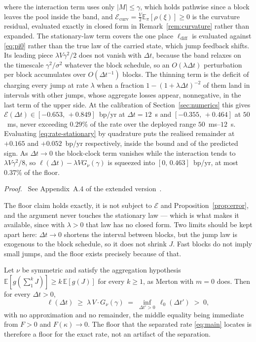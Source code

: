 \documentclass[runningheads]{llncs}
\newcommand{\E}{\mathbb{E}}
\newcommand{\dt}{\Delta t}
\newcommand{\1}{\mathbf{1}}
\newif\ifextended
\newcommand{\deferproof}[1]{%
  \par\smallskip\noindent\textit{Proof.}\ \ifextended
  See Appendix~#1.\else
  See Appendix~#1 of the extended version~\cite{bundi2026ext}.\fi\par\smallskip}
\begin{document}
\begin{proposition}
where the interaction term uses only $|M|\le\gamma$, which holds pathwise since a block leaves the pool inside the band, and $\mathcal{E}_{\mathrm{curv}} = \tfrac{V}{2}\E_\pi[\rho(\xi)] \ge 0$ is the curvature residual, evaluated exactly in closed form in Remark~\ref{rem:curvature} rather than expanded. The stationary-law term covers the one place $\ell_{\mathrm{diff}}$ is evaluated against \eqref{eq:pi0} rather than the true law of the carried state, which jump feedback shifts. Its leading piece $\lambda V\gamma^2/2$ does not vanish with $\dt$, because the band relaxes on the timescale $\gamma^2/\sigma^2$ whatever the block schedule, so an $O(\lambda\dt)$ perturbation per block accumulates over $O(\dt^{-1})$ blocks. The thinning term is the deficit of charging every jump at rate $\lambda$ when a fraction $1-(1+\lambda\dt)^{-2}$ of them land in intervals with other jumps, whose aggregate losses appear, nonnegative, in the last term of the upper side. At the calibration of Section~\ref{sec:numerics} this gives $\mathcal{E}(\dt) \in [-0.653,\,+0.849]$~bp/yr at $\dt=12$~s and $[-0.355,\,+0.464]$ at $50$~ms, never exceeding $0.29\%$ of the rate over the deployed range $50$~ms--$12$~s. Evaluating \eqref{eq:rate-stationary} by quadrature puts the realised remainder at $+0.165$ and $+0.052$~bp/yr respectively, inside the bound and of the predicted sign. As $\dt\to0$ the block-clock term vanishes while the interaction tends to $\lambda V\gamma^2/8$, so $\ell(\dt) - \lambda VG_\nu(\gamma)$ is squeezed into $[0,\,0.463]$~bp/yr, at most $0.37\%$ of the floor.
\end{proposition}

\deferproof{A.4}

The floor claim holds exactly, it is not subject to $\mathcal{E}$ and Proposition~\ref{prop:error}, and the argument never touches the stationary law --- which is what makes it available, since with $\lambda>0$ that law has no closed form. Two limits should be kept apart here: $\dt\to0$ shortens the interval between blocks, but the jump law is exogenous to the block schedule, so it does not shrink $J$. Fast blocks do not imply small jumps, and the floor exists precisely because of that.

\begin{theorem}\label{thm:floor}
Let $\nu$ be symmetric and satisfy the aggregation hypothesis $\E[g(\sum_1^k J)] \ge k\,\E[g(J)]$ for every $k\ge1$, as Merton with $m=0$ does. Then for every $\dt>0$,
\[
\ell(\dt) \;\ge\; \lambda\,V \cdot G_\nu(\gamma) \;=\; \inf_{\dt'>0}\,\ell_0(\dt') \;>\; 0,
\]
with no approximation and no remainder, the middle equality being immediate from $F>0$ and $F(\kappa)\to0$. The floor that the separated rate \eqref{eq:main} locates is therefore a floor for the exact rate, not an artifact of the separation.
\end{theorem}
\end{document}
